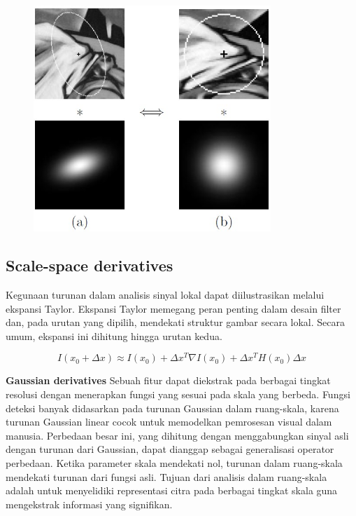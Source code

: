 \begin{figure}
  \centering{}
  \includegraphics[width=0.8\textwidth]{gambar/Smoothing gaussian kernel.jpg}
  \caption{}
\end{figure}

\subsection{\textbf{Scale-space derivatives}}

Kegunaan turunan dalam analisis sinyal lokal dapat diilustrasikan melalui ekspansi Taylor. 
Ekspansi Taylor memegang peran penting dalam desain filter dan, pada urutan yang dipilih, mendekati struktur gambar secara lokal. 
Secara umum, ekspansi ini dihitung hingga urutan kedua.

\begin{equation*}
  I(x_{0} +\Delta x) \approx I(x_{0}) + \Delta x^{T}\nabla  I(x_{0}) + \Delta x^{T} H(x_{0}) \Delta x
\end{equation*}

\textbf{Gaussian derivatives} Sebuah fitur dapat diekstrak pada berbagai tingkat resolusi dengan menerapkan fungsi yang sesuai pada skala yang berbeda. 
Fungsi deteksi banyak didasarkan pada turunan Gaussian dalam ruang-skala, karena turunan Gaussian linear cocok untuk memodelkan pemrosesan visual dalam manusia. 
Perbedaan besar ini, yang dihitung dengan menggabungkan sinyal asli dengan turunan dari Gaussian, dapat dianggap sebagai generalisasi operator perbedaan. 
Ketika parameter skala mendekati nol, turunan dalam ruang-skala mendekati turunan dari fungsi asli. 
Tujuan dari analisis dalam ruang-skala adalah untuk menyelidiki representasi citra pada berbagai tingkat skala guna mengekstrak informasi yang signifikan.

